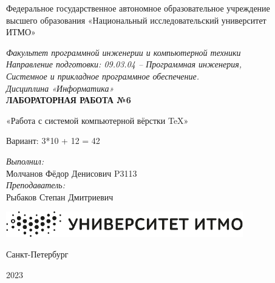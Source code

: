 \documentclass[main.tex]{subfiles}
\begin{document}
\begin{center}
Федеральное государственное автономное образовательное учреждение\\
высшего образования «Национальный исследовательский университет\\
ИТМО»

\hfill \break
\textit{Факультет программной инженерии и компьютерной техники\\
Направление подготовки: 09.03.04 – Программная инженерия, \\Системное и прикладное программное обеспечение.\\
Дисциплина «Информатика»}\\
\vspace{2.5cm}
\large{\textbf{ЛАБОРАТОРНАЯ РАБОТА №6}}\\
\begin{center}
    «Работа с системой компьютерной вёрстки \TeX»
\end{center}

\hfill \break
Вариант: {3*10 + 12 = 42}\\
\end{center}

\vspace{8cm}
 
\begin{flushright}
\textit{Выполнил:}\\
Молчанов Фёдор Денисович P3113\\
\textit{Преподаватель:}\\
Рыбаков Степан Дмитриевич\\
\end{flushright}
 
\vfill

\begin{center}
\includegraphics[scale=0.5]{itmo}
\end{center}
\begin{center} Санкт-Петербург

2023 
\end{center}

\newpage
\end{document}

